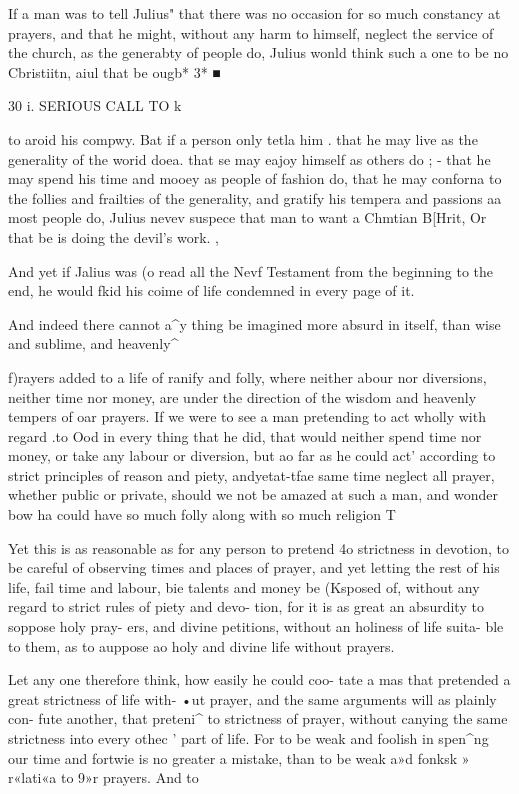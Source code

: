 \documentclass[
]{book}
\begin{document}
If a man was to tell Julius" that there was no occasion for so much constancy at prayers, and that he might, without any harm to himself, neglect the service of the church, as the generabty of people do, Julius wonld think such a one to be no Cbristiitn, aiul that be ougb* 3* ■

30 i. SERIOUS CALL TO k

to aroid his compwy. Bat if a person only tetla him . that he may live as the generality of the worid doea. that se may eajoy himself as others do ; - that he may spend his time and mooey as people of fashion do, that he may conforna to the follies and frailties of the generality, and gratify his tempera and passions aa most people do, Julius nevev suspece that man to want a Chmtian B{[}Hrit, Or that be is doing the devil's work. ,

And yet if Jalius was (o read all the Nevf Testament from the beginning to the end, he would fkid his coime of life condemned in every page of it.

And indeed there cannot a\^{}y thing be imagined more absurd in itself, than wise and sublime, and heavenly\^{}

f)rayers added to a life of ranify and folly, where neither abour nor diversions, neither time nor money, are under the direction of the wisdom and heavenly tempers of oar prayers. If we were to see a man pretending to act wholly with regard .to Ood in every thing that he did, that would neither spend time nor money, or take any labour or diversion, but ao far as he could act' according to strict principles of reason and piety, andyetat-tfae same time neglect all prayer, whether public or private, should we not be amazed at such a man, and wonder bow ha could have so much folly along with so much religion T

Yet this is as reasonable as for any person to pretend 4o strictness in devotion, to be careful of observing times and places of prayer, and yet letting the rest of his life, fail time and labour, bie talents and money be (Ksposed of, without any regard to strict rules of piety and devo- tion, for it is as great an absurdity to soppose holy pray- ers, and divine petitions, without an holiness of life suita- ble to them, as to auppose ao holy and divine life without prayers.

Let any one therefore think, how easily he could coo- tate a mas that pretended a great strictness of life with- •ut prayer, and the same arguments will as plainly con- fute another, that preteni\^{} to strictness of prayer, without canying the same strictness into every othec ' part of life. For to be weak and foolish in spen\^{}ng our time and fortwie is no greater a mistake, than to be weak a»d fonksk » r«lati«a to 9»r prayers. And to
\end{document}
